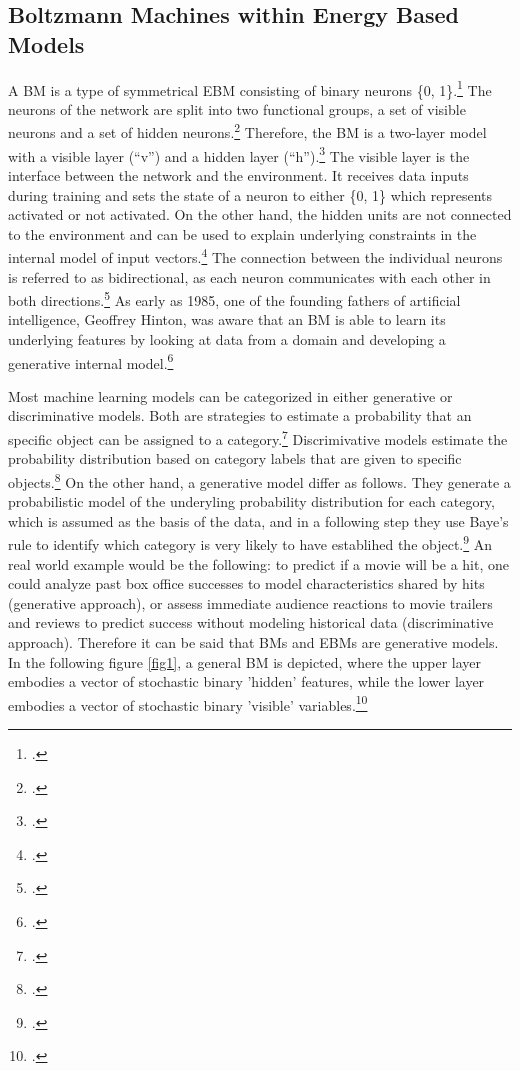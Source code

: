 \subsection{Boltzmann Machines within Energy Based Models}

A \ac{BM} is a type of symmetrical \ac{EBM} consisting of binary neurons \{0, 1\}.\footcite[cf.][260]{amariInformationGeometryBoltzmann1992}
The neurons of the network are split into two functional groups, a set of visible neurons and a set of hidden neurons.\footcite[cf.][154]{ackleyLearningAlgorithmBoltzmann1985}
Therefore, the \ac{BM} is a two-layer model with a visible layer (``v'') and a hidden layer (``h'').\footcite[cf.][448]{salakhutdinovDeepBoltzmannMachines2009}
The visible layer is the interface between the network and the environment. It receives data inputs during training and sets the state of a neuron to either \{0, 1\} which represents activated or not activated.
On the other hand, the hidden units are not connected to the environment and can be used to explain underlying constraints in the internal model of input vectors.\footcite[cf.][154]{ackleyLearningAlgorithmBoltzmann1985}
The connection between the individual neurons is referred to as bidirectional, as each neuron communicates with each other in both directions.\footcite[cf.][149]{ackleyLearningAlgorithmBoltzmann1985}
As early as 1985, one of the founding fathers of artificial intelligence, Geoffrey Hinton, was aware that an \ac{BM} is able to learn its underlying features by looking at data from a domain and developing a generative internal model.\footcite[cf.][148]{ackleyLearningAlgorithmBoltzmann1985}

Most machine learning models can be categorized in either generative or discriminative models. Both are strategies to estimate a probability that an specific object can be assigned to a category.\footcite[cf.][1]{hsuEffectsGenerativeDiscriminative2010}
Discrimivative models estimate the probability distribution based on category labels that are given to specific objects.\footcite[cf.][2]{gmComprehensiveSurveyAnalysis2020}
On the other hand, a generative model differ as follows. 
They generate a probabilistic model of the underyling probability distribution for each category, which is assumed as the basis of the data, and in a following step they use Baye's rule to identify which category is very likely to have establihed the object.\footcite[cf.][1]{hsuEffectsGenerativeDiscriminative2010}
An real world example would be the following: to predict if a movie will be a hit, one could analyze past box office successes to model characteristics shared by hits (generative approach), or assess immediate audience reactions to movie trailers and reviews to predict success without modeling historical data (discriminative approach).
Therefore it can be said that \ac{BM}s and \ac{EBM}s are generative models. In the following figure \ref{fig1}, a general \ac{BM} is depicted, where the upper layer embodies a vector of stochastic binary 'hidden' features, while the lower layer embodies a vector of stochastic binary 'visible' variables.\footcite[cf.][449]{salakhutdinovDeepBoltzmannMachines2009}

